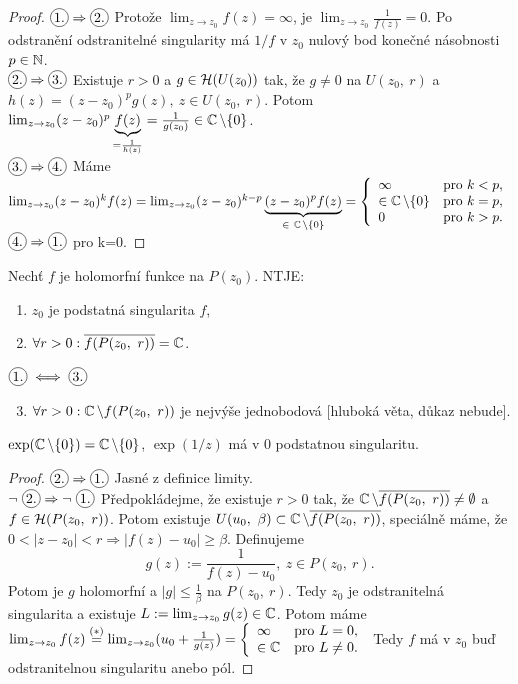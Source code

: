 \begin{proof}
$\circled{1.}\Rightarrow\circled{2.}$ Protože $\lim_{z\rightarrow z_0}f(z)=\infty$, je $\lim_{z\rightarrow z_0}\frac{1}{f(z)}=0$. Po odstranění odstranitelné singularity má $1/f$ v $z_0$ nulový bod konečné násobnosti $p\in\operatorname{\mathbb{N}}$.\\
$\circled{2.}\Rightarrow\circled{3.}$ Existuje $r>0$ a $g\in\operatorname{\mathcal{H}}(U(z_0))$ tak, že $g\neq 0$ na $U(z_0,\ r)$ a $h(z)=(z-z_0)^p g(z),\ z\in U(z_0,\ r)$. Potom $\lim_{z\rightarrow z_0}(z-z_0)^p\underbrace{f(z)}_{=\frac{1}{h(z)}}=\frac{1}{g(z_0)}\in\operatorname{\mathbb{C}}\setminus\{0\}$.\\
$\circled{3.}\Rightarrow\circled{4.}$ Máme $\lim_{z\rightarrow z_0}(z-z_0)^kf(z)=\lim_{z\rightarrow z_0}(z-z_0)^{k-p}\underbrace{(z-z_0)^pf(z)}_{\in\ \Comp\setminus\{0\}}=\threepartdef{\infty}{k<p,}{\in\Comp\setminus\{0\}}{k=p,}{0}{k>p.}$\\
$\circled{4.}\Rightarrow\circled{1.}$ pro k=0.
\end{proof}

\begin{theorem} Nechť $f$ je holomorfní funkce na $P(z_0)$. NTJE:
\begin{enumerate}
    \item $z_0$ je podstatná singularita $f$,
    \item $\forall r>0: \overline{f(P(z_0,\ r))}=\Comp$.
\end{enumerate}
\end{theorem}
\begin{note} $\circled{1.}\iff\circled{3.}$
\begin{enumerate}
\setcounter{enumi}{2}
    \item $\forall r>0:\operatorname{\mathbb{C}}\setminus f(P(z_0,\ r))$ je nejvýše jednobodová [hluboká věta, důkaz nebude].
\end{enumerate}

\begin{example}
$\exp(\operatorname{\mathbb{C}}\setminus\{0\})=\operatorname{\mathbb{C}}\setminus\{0\}$, $\exp(1/z)$ má v 0 podstatnou singularitu.
\end{example}
\end{note}
\begin{proof}
$\circled{2.}\Rightarrow\circled{1.}$ Jasné z definice limity.\\
$\neg\ \circled{2.}\Rightarrow\neg\ \circled{1.}$ Předpokládejme, že existuje $r>0$ tak, že $\Comp\setminus\overline{f(P(z_0,\ r))}\neq\emptyset$ a $f\in\Holo(P(z_0,\ r))$. Potom existuje $U(u_0,\ \beta)\subset\Comp\setminus\overline{f(P(z_0,\ r))}$, speciálně máme, že $0<|z-z_0|<r\Rightarrow|f(z)-u_0|\geq\beta$. 
Definujeme 
\begin{equation*} \tag{*}
    g(z):=\frac{1}{f(z)-u_0},\ z\in P(z_0,\ r)\text{.}
\end{equation*} 
Potom je $g$ holomorfní a $|g|\leq\frac{1}{\beta}$ na $P(z_0,\ r)$. Tedy $z_0$ je odstranitelná singularita a existuje $L:=\lim_{z\rightarrow z_0}g(z)\in\operatorname{\mathbb{C}}$. Potom máme $\lim_{z\rightarrow z_0}f(z)\stackrel{(*)}{=}\lim_{z\rightarrow z_0}(u_0+\frac{1}{g(z)})=\left\{ \begin{array}{ll} \infty & \mbox{pro } L=0, \\ \in\operatorname{\mathbb{C}} & \mbox{pro } L\neq0. \end{array} \right.$
Tedy $f$ má v $z_0$ buď odstranitelnou singularitu anebo pól.
\end{proof}
